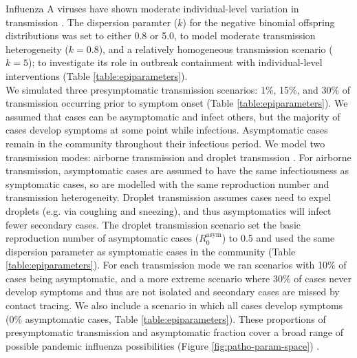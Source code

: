 \documentclass{article}
\begin{document}
Influenza A viruses have shown moderate individual-level variation in transmission \citep{fraserPandemicPotentialStrain2009, heComparingCOVID191918192020, Ward2024.12.11.24318702}. The dispersion paramter ($k$) for the negative binomial offspring distributions was set to either 0.8 or 5.0, to model moderate transmission heterogeneity ($k = 0.8$), and a relatively homogeneous transmission scenario ($k = 5$); to investigate its role in outbreak containment with individual-level interventions (Table \ref{table:epiparameters}). \\

We simulated three presymptomatic transmission scenarios: 1\%, 15\%, and 30\% of transmission occurring prior to symptom onset (Table \ref{table:epiparameters}). We assumed that cases can be asymptomatic and infect others, but the majority of cases develop symptoms at some point while infectious. Asymptomatic cases remain in the community throughout their infectious period. We model two transmission modes: airborne transmission and droplet transmssion \citep{tellierRecognitionAerosolTransmission2019}. For airborne transmission, asymptomatic cases are assumed to have the same infectiousness as symptomatic cases, so are modelled with the same reproduction number and transmission heterogeneity. Droplet transmission assumes cases need to expel droplets (e.g. via coughing and sneezing), and thus asymptomatics will infect fewer secondary cases. The droplet transmission scenario set the basic reproduction number of asymptomatic cases ($R_0^\mathrm{asym}$) to 0.5 and used the same dispersion parameter as symptomatic cases in the community (Table \ref{table:epiparameters}). For each transmission mode we ran scenarios with 10\% of cases being asymptomatic, and a more extreme scenario where 30\% of cases never develop symptoms and thus are not isolated and secondary cases are missed by contact tracing. We also include a scenario in which all cases develop symptoms (0\% asymptomatic cases, Table \ref{table:epiparameters}). These proportions of presymptomatic transmission and asymptomatic fraction cover a broad range of possible pandemic influenza possibilities (Figure \ref{fig:patho-param-space}) \citep{lesslerOutbreak2009Pandemic2009, xuSerologicalInvestigationSubclinical2013, montgomeryRoleAsymptomaticInfections2024, gargHighlyPathogenicAvian2025}.
\end{document}
